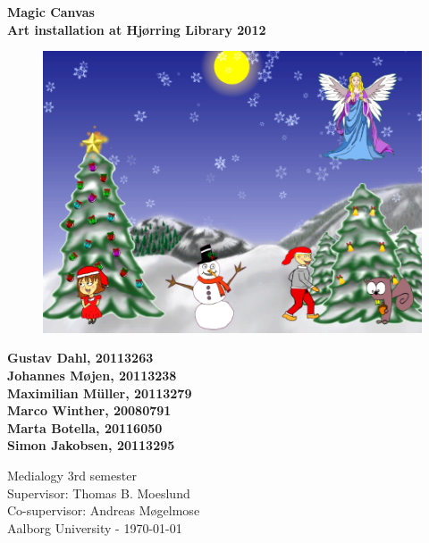 \thispagestyle{empty} %
\hspace{6cm} \vspace{0.1cm}
\begin{center}
\textbf{\Huge {Magic Canvas}\\ \vspace{1cm}
\huge{Art installation at Hj{\o}rring Library 2012}}
\begin{figure} [H]
\includegraphics[width=1.0\textwidth]{Pictures/Design/frontPage}
\centering
\label{building_diagonal_edge}
\end{figure}
\end{center}
\begin{center}
\Large{\textbf{Gustav Dahl, 20113263 \\ Johannes M{\o}jen, 20113238
\\ Maximilian M\"uller, 20113279 \\ Marco Winther, 20080791 \\ Marta Botella, 20116050
\\ Simon Jakobsen, 20113295}}
\end{center}
\vfill
Medialogy 3rd semester\\
Supervisor: Thomas B. Moeslund\\
Co-supervisor: Andreas M{\o}gelmose\\
Aalborg University - \today
\setcounter{page}{0}